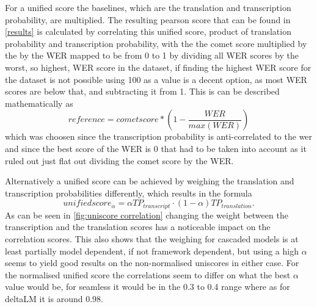 For a unified score the baselines, which are the translation and transcription probability, are multiplied. 
The resulting pearson score that can be found in \autoref{results} is calculated by correlating this unified score, product of translation probability and transcription probability, with the the comet score multiplied by the by the WER mapped to be from 0 to 1 by dividing all WER scores by the worst, so highest, WER score in the dataset, if finding the highest WER score for the dataset is not possible using 100 as a value is a decent option, as most WER scores are below that, and subtracting it from 1. 
This is can be described mathematically as 
$$reference = cometscore*(1-\frac{WER}{max(WER)})$$
which was choosen since the transcription probability is anti-correlated to the wer and since the best score of the WER is 0 that had to be taken into account as it ruled out just flat out dividing the comet score by the WER.

Alternatively a unified score can be achieved by weighing the translation and transcription probabilities differently, which results in the formula $$unifiedscore_\alpha= \alpha TP_{transcript} \cdot (1-\alpha)TP_{translation}.$$ 
As can be seen in \autoref{fig:uniscore correlation} changing the weight between the transcription and the translation scores has a noticeable impact on the correlation scores. 
This also shows that the weighing for cascaded models is at least partially model dependent, if not framework dependent, but using a high $\alpha$ seems to yield good results on the non-normalised uniscores in either case. 
For the normalised unified score the correlations seem to differ on what the best $\alpha$ value would be, for seamless it would be in the 0.3 to 0.4 range where as for deltaLM it is around 0.98. 

